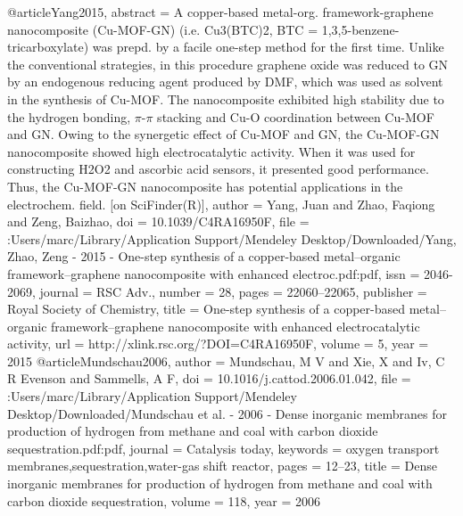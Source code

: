 @article{Yang2015,
abstract = {A copper-based metal-org. framework-graphene nanocomposite (Cu-MOF-GN) (i.e. Cu3(BTC)2, BTC = 1,3,5-benzene-tricarboxylate) was prepd. by a facile one-step method for the first time.  Unlike the conventional strategies, in this procedure graphene oxide was reduced to GN by an endogenous reducing agent produced by DMF, which was used as solvent in the synthesis of Cu-MOF.  The nanocomposite exhibited high stability due to the hydrogen bonding, $\pi$-$\pi$ stacking and Cu-O coordination between Cu-MOF and GN.  Owing to the synergetic effect of Cu-MOF and GN, the Cu-MOF-GN nanocomposite showed high electrocatalytic activity.  When it was used for constructing H2O2 and ascorbic acid sensors, it presented good performance.  Thus, the Cu-MOF-GN nanocomposite has potential applications in the electrochem. field. [on SciFinder(R)]},
author = {Yang, Juan and Zhao, Faqiong and Zeng, Baizhao},
doi = {10.1039/C4RA16950F},
file = {:Users/marc/Library/Application Support/Mendeley Desktop/Downloaded/Yang, Zhao, Zeng - 2015 - One-step synthesis of a copper-based metal–organic framework–graphene nanocomposite with enhanced electroc.pdf:pdf},
issn = {2046-2069},
journal = {RSC Adv.},
number = {28},
pages = {22060--22065},
publisher = {Royal Society of Chemistry},
title = {{One-step synthesis of a copper-based metal–organic framework–graphene nanocomposite with enhanced electrocatalytic activity}},
url = {http://xlink.rsc.org/?DOI=C4RA16950F},
volume = {5},
year = {2015}
}
@article{Mundschau2006,
author = {Mundschau, M V and Xie, X and Iv, C R Evenson and Sammells, A F},
doi = {10.1016/j.cattod.2006.01.042},
file = {:Users/marc/Library/Application Support/Mendeley Desktop/Downloaded/Mundschau et al. - 2006 - Dense inorganic membranes for production of hydrogen from methane and coal with carbon dioxide sequestration.pdf:pdf},
journal = {Catalysis today},
keywords = {oxygen transport membranes,sequestration,water-gas shift reactor},
pages = {12--23},
title = {{Dense inorganic membranes for production of hydrogen from methane and coal with carbon dioxide sequestration}},
volume = {118},
year = {2006}
}
